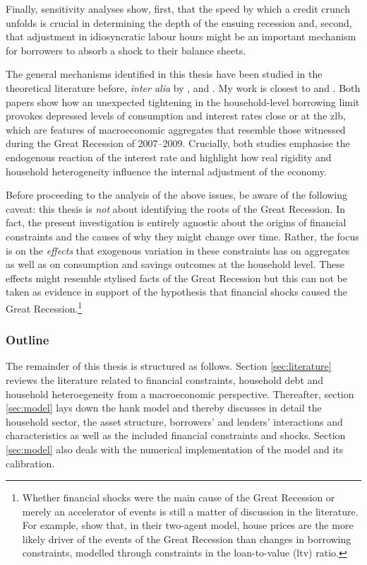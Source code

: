 \documentclass[12pt]{article} %
\numberwithin{equation}{section} %
\numberwithin{figure}{section}
\numberwithin{table}{section}
\begin{document}
Finally, sensitivity analyses show, first, that the speed by which a credit crunch unfolds is crucial in determining the depth of the ensuing recession and, second, that adjustment in idiosyncratic labour hours might be an important mechanism for borrowers to absorb a shock to their balance sheets.

The general mechanisms identified in this thesis have been studied in the theoretical literature before, \textit{inter alia} by \textcite{egg2012}, \textcite{riosrull2015} and \textcite{gl2017}. My work is closest to \textcite{egg2012} and \textcite{gl2017}. Both papers show how an unexpected tightening in the household-level borrowing limit provokes depressed levels of consumption and interest rates close or at the \Gls{zlb}, which are features of macroeconomic aggregates that resemble those witnessed during the Great Recession of 2007--2009. Crucially, both studies emphasise the endogenous reaction of the interest rate and highlight how real rigidity and household heterogeneity influence the internal adjustment of the economy.

Before proceeding to the analysis of the above issues, be aware of the following caveat: this thesis is \textit{not} about identifying the roots of the Great Recession. In fact, the present investigation is entirely agnostic about the origins of financial constraints and the causes of why they might change over time. Rather, the focus is on the \textit{effects} that exogenous variation in these constraints has on aggregates as well as on consumption and savings outcomes at the household level. These effects might resemble stylised facts of the Great Recession but this can not be taken as evidence in support of the hypothesis that financial shocks caused the Great Recession.\footnote{Whether financial shocks were the main cause of the Great Recession or merely an accelerator of events is still a matter of discussion in the literature. For example, \textcite{justiniano2015} show that, in their two-agent model, house prices are the more likely driver of the events of the Great Recession than changes in borrowing constraints, modelled through constraints in the loan-to-value (\Gls{ltv}) ratio.}

\subsubsection*{Outline}
\label{sec:outline}
The remainder of this thesis is structured as follows. Section \ref{sec:literature} reviews the literature related to financial constraints, household debt and household heteroegeneity from a macroeconomic perspective. Thereafter, section \ref{sec:model} lays down the \Gls{hank} model and thereby discusses in detail the household sector, the asset structure, borrowers' and lenders' interactions and characteristics as well as the included financial constraints and shocks. Section \ref{sec:model} also deals with the numerical implementation of the model and its calibration. 
\end{document}
